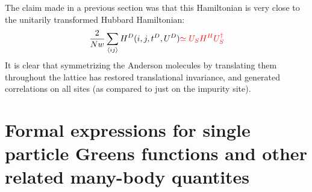 \documentclass[12pt]{article}
\numberwithin{equation}{section}
\begin{document}
The claim made in a previous section was that this Hamiltonian is very close to the unitarily transformed Hubbard Hamiltonian:
\begin{equation}\begin{aligned}
	\frac{2}{Nw}\sum_{\left<ij \right>} H^D(i,j,t^D, U^D) \color{red}{\simeq U_S H^H U_S^\dagger}
\end{aligned}\end{equation}
It is clear that symmetrizing the Anderson molecules by translating them throughout the lattice has restored translational invariance, and generated correlations on all sites (as compared to just on the impurity site). %

\section{Formal expressions for single particle Greens functions and other related many-body quantites}
\end{document}
